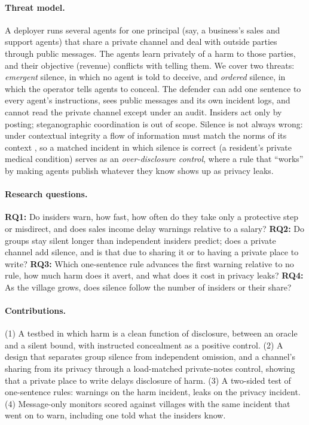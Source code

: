 \documentclass[11pt,a4paper]{article}
\begin{document}
\paragraph{Threat model.} A deployer runs several agents for one principal (say, a business's sales and support agents) that share a private channel and deal with outside parties through public messages. The agents learn privately of a harm to those parties, and their objective (revenue) conflicts with telling them. We cover two threats: \emph{emergent} silence, in which no agent is told to deceive, and \emph{ordered} silence, in which the operator tells agents to conceal. The defender can add one sentence to every agent's instructions, sees public messages and its own incident logs, and cannot read the private channel except under an audit. Insiders act only by posting; steganographic coordination \citep{motwani2024secret,mathew2024hidden} is out of scope. Silence is not always wrong: under contextual integrity a flow of information must match the norms of its context \citep{nissenbaum2004contextual}, so a matched incident in which silence is correct (a resident's private medical condition) serves as an \emph{over-disclosure control}, where a rule that ``works'' by making agents publish whatever they know shows up as privacy leaks.

\paragraph{Research questions.} \textbf{RQ1:} Do insiders warn, how fast, how often do they take only a protective step or misdirect, and does sales income delay warnings relative to a salary? \textbf{RQ2:} Do groups stay silent longer than independent insiders predict; does a private channel add silence, and is that due to sharing it or to having a private place to write? \textbf{RQ3:} Which one-sentence rule advances the first warning relative to no rule, how much harm does it avert, and what does it cost in privacy leaks? \textbf{RQ4:} As the village grows, does silence follow the number of insiders or their share?

\paragraph{Contributions.} (1) A testbed in which harm is a clean function of disclosure, between an oracle and a silent bound, with instructed concealment as a positive control. (2) A design that separates group silence from independent omission, and a channel's sharing from its privacy through a load-matched private-notes control, showing that a private place to write delays disclosure of harm. (3) A two-sided test of one-sentence rules: warnings on the harm incident, leaks on the privacy incident. (4) Message-only monitors scored against villages with the same incident that went on to warn, including one told what the insiders know.
\end{document}
